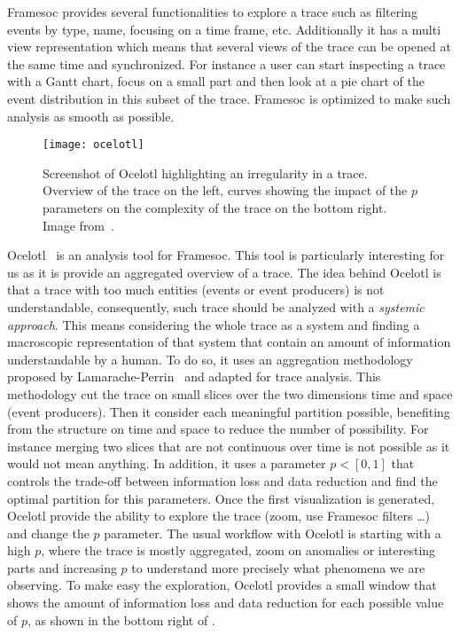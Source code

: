 \gls{Framesoc} provides several functionalities to explore a trace such as filtering events by type, name, focusing on a time frame, etc.
Additionally it has a multi view representation which means that several views of the trace can be opened at the same time and synchronized.
For instance a user can start inspecting a trace with a Gantt chart, focus on a small part and then look at a pie chart of the event distribution in this subset of the trace.
\gls{Framesoc} is optimized to make such analysis as smooth as possible.

\begin{figure}[htb]
    \centering
    \texttt{[image: ocelotl]}
    \caption[Screenshot of Ocelotl.]{
        Screenshot of Ocelotl highlighting an irregularity in a trace.\\
        Overview of the trace on the left, curves showing the impact of the $p$ parameters on the complexity of the trace on the bottom right.\\
        Image from~\cite{Dosimont14Ocelotl}.}
    \label{fig:ocelotl-overview}
\end{figure}

\gls{Ocelotl}~\cite{Dosimont14Ocelotl} is an analysis tool for \gls{Framesoc}.
This tool is particularly interesting for us as it is provide an aggregated overview of a trace.
The idea behind \gls{Ocelotl} is that a trace with too much entities (events or event producers) is not understandable, consequently, such trace should be analyzed with a \emph{systemic approach}.
This means considering the whole trace as a system and finding a macroscopic representation of that system that contain an amount of information understandable by a human.
To do so, it uses an aggregation methodology proposed by Lamarache-Perrin~\cite{Lamarche_Perrin14Agregation} and adapted for trace analysis.
This methodology cut the trace on small slices over the two dimensions time and space (event producers).
Then it consider each meaningful partition possible, benefiting from the structure on time and space to reduce the number of possibility.
For instance merging two slices that are not continuous over time is not possible as it would not mean anything.
In addition, it uses a parameter $p<[0,1]$ that controls the trade-off between information loss and data reduction and find the optimal partition for this parameters.
Once the first visualization is generated, \gls{Ocelotl} provide the ability to explore the trace (zoom, use \gls{Framesoc} filters \ldots) and change the $p$ parameter.
The usual workflow with \gls{Ocelotl} is starting with a high $p$, where the trace is mostly aggregated, zoom on anomalies or interesting parts and increasing $p$ to understand more precisely what phenomena we are observing.
To make easy the exploration, \gls{Ocelotl} provides a small window that shows the amount of information loss and data reduction for each possible value of $p$, as shown in the bottom right of .


